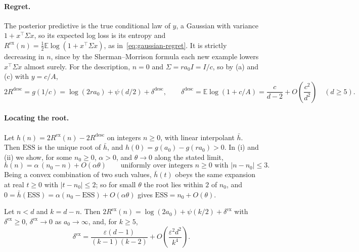 \documentclass[10pt]{article}
\newcommand{\ess}{\mathrm{ESS}}
\newcommand{\E}{\mathbb{E}}
\begin{document}
\paragraph{Regret.}
The posterior predictive is the true conditional law of $y$, a Gaussian with variance $1 + x^\top \Sigma x$, so its expected log loss is its entropy and $R^{\mathrm{ex}}(n) = \tfrac12 \E \log(1 + x^\top \Sigma x)$, as in~\eqref{eq:gaussian-regret}. It is strictly decreasing in $n$, since by the Sherman--Morrison formula each new example lowers $x^\top \Sigma x$ almost surely. For the description, $n = 0$ and $\Sigma = r a_0 I = I/c$, so by (a) and (c) with $y = c/A$,
\begin{equation}\label{eq:rdesc}
2R^{\mathrm{desc}} = g(1/c) = \log(2 r a_0) + \psi(d/2) + \delta^{\mathrm{desc}},
\qquad
\delta^{\mathrm{desc}} = \E \log(1 + c/A) = \frac{c}{d-2} + O\!\left(\frac{c^2}{d^2}\right) \quad (d \ge 5).
\end{equation}

\paragraph{Locating the root.}
Let $h(n) = 2R^{\mathrm{ex}}(n) - 2R^{\mathrm{desc}}$ on integers $n \ge 0$, with linear interpolant $\bar h$. Then $\ess$ is the unique root of $\bar h$, and $h(0) = g(a_0) - g(r a_0) > 0$. In (i) and (ii) we show, for some $n_0 \ge 0$, $\alpha > 0$, and $\theta \to 0$ along the stated limit,
\begin{equation}\label{eq:root}
h(n) = \alpha\,(n_0 - n) + O(\alpha\theta)
\qquad \text{uniformly over integers $n \ge 0$ with $|n - n_0| \le 3$.}
\end{equation}
Being a convex combination of two such values, $\bar h(t)$ obeys the same expansion at real $t \ge 0$ with $|t - n_0| \le 2$; so for small $\theta$ the root lies within $2$ of $n_0$, and $0 = \bar h(\ess) = \alpha(n_0 - \ess) + O(\alpha\theta)$ gives $\ess = n_0 + O(\theta)$.

\begin{lemma}\label{lem:few}
Let $n < d$ and $k = d - n$. Then $2R^{\mathrm{ex}}(n) = \log(2a_0) + \psi(k/2) + \delta^{\mathrm{ex}}$ with $\delta^{\mathrm{ex}} \ge 0$, $\delta^{\mathrm{ex}} \to 0$ as $a_0 \to \infty$, and, for $k \ge 5$,
\[
\delta^{\mathrm{ex}} = \frac{\varepsilon (d-1)}{(k-1)(k-2)} + O\!\left(\frac{\varepsilon^2 d^2}{k^4}\right).
\]
\end{lemma}
\end{document}
